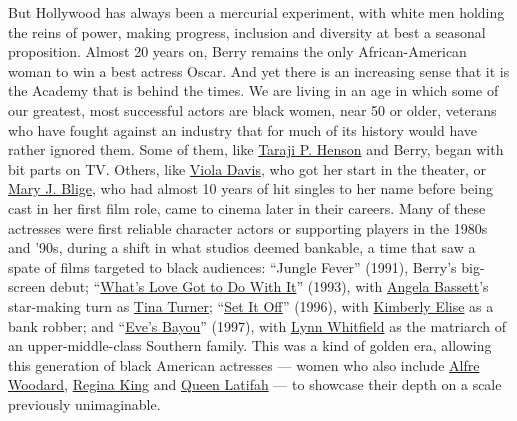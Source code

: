 But Hollywood has always been a mercurial experiment, with white men
holding the reins of power, making progress, inclusion and diversity at
best a seasonal proposition. Almost 20 years on, Berry remains the only
African-American woman to win a best actress Oscar. And yet there is an
increasing sense that it is the Academy that is behind the times. We are
living in an age in which some of our greatest, most successful actors
are black women, near 50 or older, veterans who have fought against an
industry that for much of its history would have rather ignored them.
Some of them, like
\href{https://www.nytimes.com/interactive/2016/12/08/magazine/great-performers-la-noir-photo-essay.html}{Taraji
P. Henson} and Berry, began with bit parts on TV. Others, like
\href{https://www.nytimes.com/2014/09/14/magazine/viola-davis.html}{Viola
Davis}, who got her start in the theater, or
\href{https://www.nytimes.com/2016/05/19/t-magazine/entertainment/90s-hip-hop-stylist-misa-hylton.html}{Mary
J. Blige}, who had almost 10 years of hit singles to her name before
being cast in her first film role, came to cinema later in their
careers. Many of these actresses were first reliable character actors or
supporting players in the 1980s and '90s, during a shift in what studios
deemed bankable, a time that saw a spate of films targeted to black
audiences: ``Jungle Fever'' (1991), Berry's big-screen debut;
``\href{https://www.nytimes.com/watching/titles/movies/1000188146}{What's
Love Got to Do With It}'' (1993), with
\href{https://www.nytimes.com/2019/07/26/arts/angela-bassett-otherhood-911-black-panther.html}{Angela
Bassett}'s star-making turn as
\href{https://www.nytimes.com/topic/person/tina-turner}{Tina Turner};
``\href{https://www.nytimes.com/watching/titles/movies/1000104774}{Set
It Off}'' (1996), with
\href{https://www.imdb.com/name/nm0253708/}{Kimberly Elise} as a bank
robber; and
``\href{https://www.nytimes.com/watching/titles/eves-bayou}{Eve's
Bayou}'' (1997), with \href{https://www.imdb.com/name/nm0005551/}{Lynn
Whitfield} as the matriarch of an upper-middle-class Southern family.
This was a kind of golden era, allowing this generation of black
American actresses --- women who also include
\href{https://www.nytimes.com/2020/01/03/movies/alfre-woodard-clemency.html}{Alfre
Woodard},
\href{https://www.nytimes.com/2016/03/06/arts/television/regina-king-profile.html}{Regina
King} and
\href{https://www.nytimes.com/2015/05/10/arts/television/queen-latifah-stars-in-bessie-on-hbo.html}{Queen
Latifah} --- to showcase their depth on a scale previously unimaginable.

